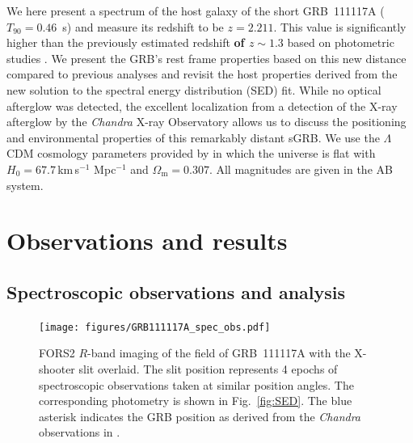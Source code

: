 \documentclass[referee]{aa}
\providecommand{\DIFaddtex}[1]{{\bf #1}} %
\providecommand{\DIFaddbegin}{} %
\providecommand{\DIFaddend}{} %
\providecommand{\DIFadd}[1]{\texorpdfstring{\DIFaddtex{#1}}{#1}} %
\newcommand{\DIFaddincludegraphics}[2][]{{\color{blue}\fbox{\DIFOincludegraphics[#1]{#2}}}} %
\DeclareRobustCommand{\DIFaddbegin}{\DIFOaddbegin \let\includegraphics\DIFaddincludegraphics} %
\DeclareRobustCommand{\DIFaddend}{\DIFOaddend \let\includegraphics\DIFOincludegraphics} %
\begin{document}
We here present a spectrum of the host galaxy of the short GRB~111117A
($T_{90}=0.46$~s) and measure its redshift to be $z=2.211$. This value is
significantly higher than the previously estimated redshift \DIFaddbegin \DIFadd{of $z \sim 1.3$ }\DIFaddend based on photometric
studies \citep{Margutti2012,Sakamoto2013}. We present the GRB's rest frame
properties based on this new distance compared to previous analyses and revisit
the host properties derived from the new solution to the spectral energy
distribution (SED) fit. While no optical afterglow was detected, the excellent
localization from a detection of the X-ray afterglow by the \emph{Chandra} X-ray
Observatory allows us to discuss the positioning and environmental properties of
this remarkably distant sGRB. We use the $\Lambda$CDM cosmology parameters
provided by \citet{Planck2015} in which the universe is flat with $H_0 =
67.7$\,km\,s$^{-1}$ Mpc$^{-1}$ and $\Omega_\mathrm{m} = 0.307$. All magnitudes
are given in the AB system.


\section{Observations and results}

\subsection{Spectroscopic observations and analysis}

\begin{figure}
	\centering
	\texttt{[image: figures/GRB111117A\_spec\_obs.pdf]}
	\caption{
	FORS2 $R$-band imaging of the field of GRB~111117A with the X-shooter slit
overlaid. The slit position represents 4 epochs of spectroscopic observations
taken at similar position angles. The corresponding photometry is shown in
Fig.~\ref{fig:SED}. The blue asterisk indicates the GRB position as derived
from the \emph{Chandra} observations in \citet{Sakamoto2013}.
	}
	\label{fig:spec_setup}
\end{figure}

\end{document}
